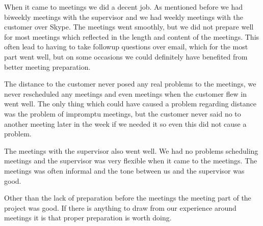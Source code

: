 When it came to meetings we did a decent job. As mentioned before we had biweekly meetings with the supervisor and we had weekly meetings with the customer over Skype. The meetings went smoothly, but we did not prepare well for most meetings which reflected in the length and content of the meetings. This often lead to having to take followup questions over email, which for the most part went well, but on some occasions we could definitely have benefited from better meeting preparation.

The distance to the customer never posed any real problems to the meetings, we never rescheduled any meetings and even meetings when the customer flew in went well. The only thing which could have caused a problem regarding distance was the problem of impromptu meetings, but the customer never said no to another meeting later in the week if we needed it so even this did not cause a problem. 

The meetings with the supervisor also went well. We had no problems scheduling meetings and the supervisor was very flexible when it came to the meetings. The meetings was often informal and the tone between us and the supervisor was good.

Other than the lack of preparation before the meetings the meeting part of the project was good. If there is anything to draw from our experience around meetings it is that proper preparation is worth doing.
